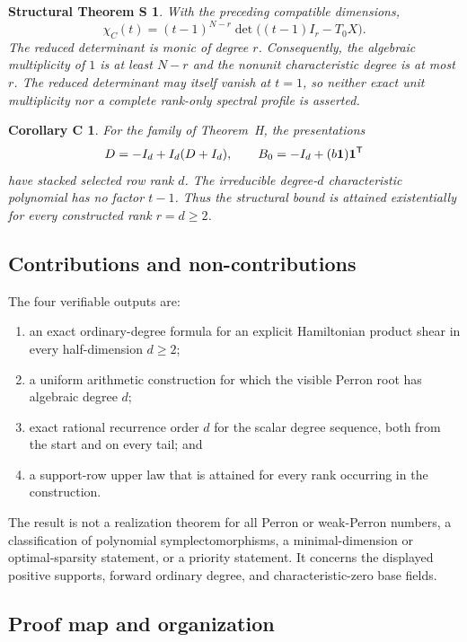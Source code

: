 \documentclass[11pt,letterpaper]{article}
\theoremstyle{plain}
\newtheorem*{theoremS}{Structural Theorem S}
\newtheorem*{corollaryC}{Corollary C}
\begin{document}
\begin{theoremS}
With the preceding compatible dimensions,
\[
\chi_C(t)=(t-1)^{N-r}\det\bigl((t-1)I_r-T_0X\bigr).
\]
The reduced determinant is monic of degree $r$.  Consequently, the algebraic multiplicity of $1$ is at least $N-r$ and the nonunit characteristic degree is at most $r$.  The reduced determinant may itself vanish at $t=1$, so neither exact unit multiplicity nor a complete rank-only spectral profile is asserted.
\end{theoremS}

\begin{corollaryC}
For the family of Theorem~H, the presentations
\[
D=-I_d+I_d(D+I_d),\qquad B_0=-I_d+(b\mathbf{1})\mathbf{1}^{\mathsf{T}}
\]
have stacked selected row rank $d$.  The irreducible degree-$d$ characteristic polynomial has no factor $t-1$.  Thus the structural bound is attained existentially for every constructed rank $r=d\geq2$.
\end{corollaryC}

\subsection{Contributions and non-contributions}

The four verifiable outputs are:
\begin{enumerate}[label=\arabic*.]
\item an exact ordinary-degree formula for an explicit Hamiltonian product shear in every half-dimension $d\geq2$;
\item a uniform arithmetic construction for which the visible Perron root has algebraic degree $d$;
\item exact rational recurrence order $d$ for the scalar degree sequence, both from the start and on every tail; and
\item a support-row upper law that is attained for every rank occurring in the construction.
\end{enumerate}
The result is not a realization theorem for all Perron or weak-Perron numbers, a classification of polynomial symplectomorphisms, a minimal-dimension or optimal-sparsity statement, or a priority statement.  It concerns the displayed positive supports, forward ordinary degree, and characteristic-zero base fields.

\subsection{Proof map and organization}
\end{document}
